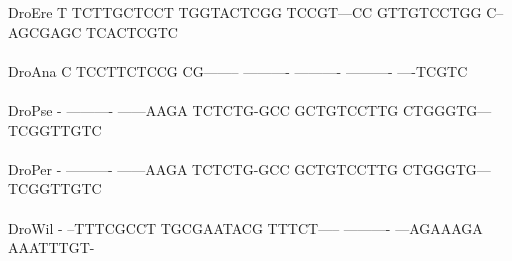 \documentclass[11pt,twoside,reqno,a4paper]{article}
\begin{document}
{DroEre	T	TCTTGCTCCT	TGGTACTCGG	TCCGT---CC	GTTGTCCTGG	C--AGCGAGC	TCACTCGTC\\
\hspace*{7\charwidth}\hspace*{1\charwidth}\hspace*{1\charwidth}\hspace*{1\charwidth}\hspace*{1\charwidth}\hspace*{1\charwidth}\hspace*{1\charwidth}\\
DroAna	C	TCCTTCTCCG	CG--------	----------	----------	----------	----TCGTC\\
\hspace*{7\charwidth}\hspace*{1\charwidth}\hspace*{1\charwidth}\hspace*{1\charwidth}\hspace*{1\charwidth}\hspace*{1\charwidth}\hspace*{1\charwidth}\\
DroPse	-	----------	------AAGA	TCTCTG-GCC	GCTGTCCTTG	CTGGGTG---	TCGGTTGTC\\
\hspace*{7\charwidth}\hspace*{1\charwidth}\hspace*{1\charwidth}\hspace*{1\charwidth}\hspace*{1\charwidth}\hspace*{1\charwidth}\hspace*{1\charwidth}\\
DroPer	-	----------	------AAGA	TCTCTG-GCC	GCTGTCCTTG	CTGGGTG---	TCGGTTGTC\\
\hspace*{7\charwidth}\hspace*{1\charwidth}\hspace*{1\charwidth}\hspace*{1\charwidth}\hspace*{1\charwidth}\hspace*{1\charwidth}\hspace*{1\charwidth}\\
DroWil	-	--TTTCGCCT	TGCGAATACG	TTTCT-----	----------	---AGAAAGA	AAATTTGT-\\
\hspace*{7\charwidth}\hspace*{1\charwidth}\hspace*{1\charwidth}\hspace*{1\charwidth}\hspace*{1\charwidth}\hspace*{1\charwidth}\hspace*{1\charwidth}\\
}
\end{document}
